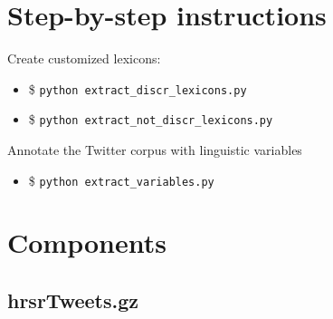 \documentclass[a4paper]{article}
\begin{document}







\section{Step-by-step instructions}

Create customized lexicons:
\begin{itemize}
\item \$ \texttt{python extract\_discr\_lexicons.py}
\item \$ \texttt{python extract\_not\_discr\_lexicons.py}
\end{itemize}

Annotate the Twitter corpus with linguistic variables
\begin{itemize}
\item \$ \texttt{python extract\_variables.py}
\end{itemize} 



\section{Components}
\subsection{hrsrTweets.gz}
\end{document}
